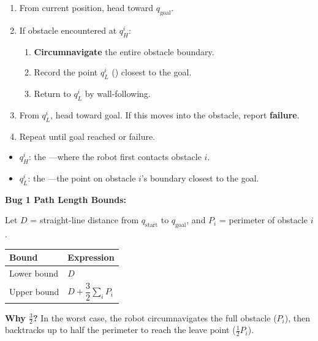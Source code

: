 \begin{thmbox}
\begin{enumerate}
  \item From current position, head toward $q_{\text{goal}}$.
  \item If obstacle encountered at  $q_H^i$:
  \begin{enumerate}
    \item \textbf{Circumnavigate} the entire obstacle boundary.
    \item Record the point $q_L^i$ () closest to the goal.
    \item Return to $q_L^i$ by wall-following.
  \end{enumerate}
  \item From $q_L^i$, head toward goal. If this moves into the obstacle, report \textbf{failure}.
  \item Repeat until goal reached or failure.
\end{enumerate}
\end{thmbox}

\begin{defbox}
\begin{itemize}
  \item $q_H^i$: the ---where the robot first contacts obstacle $i$.
  \item $q_L^i$: the ---the point on obstacle $i$'s boundary closest to the goal.
\end{itemize}
\end{defbox}

\textbf{Bug 1 Path Length Bounds:}

Let $D$ = straight-line distance from $q_{\text{start}}$ to $q_{\text{goal}}$, and $P_i$ = perimeter of obstacle $i$.

\begin{center}
\renewcommand{\arraystretch}{1.3}
\begin{tabular}{@{} l l @{}}
\toprule
\textbf{Bound} & \textbf{Expression} \\
\midrule
Lower bound & $D$ \\
Upper bound & $D + \dfrac{3}{2} \sum_i P_i$ \\
\bottomrule
\end{tabular}
\end{center}

\textbf{Why $\frac{3}{2}$?} In the worst case, the robot circumnavigates the full obstacle ($P_i$), then backtracks up to half the perimeter to reach the leave point ($\frac{1}{2}P_i$).


